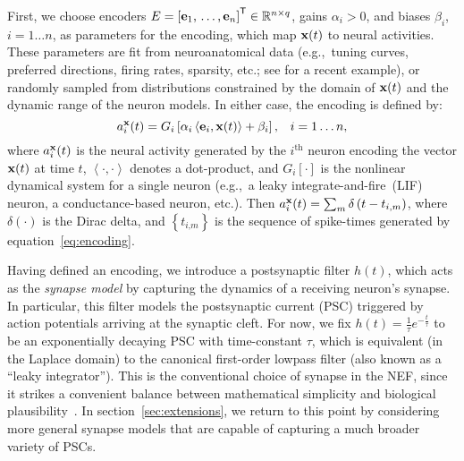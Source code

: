 First, we choose encoders $E = {\left[ \mathbf{e}_1\text{,}\, \ldots\text{,}\, \mathbf{e}_n \right]}^\mathsf{T} \in \mathbb{R}^{n \times q}$, gains $\alpha_i > 0$, and biases $\beta_i$, $i = 1 \ldots n$, as parameters for the encoding, which map $\mathbf{x}(t)$ to neural activities.
These parameters are fit from neuroanatomical data (e.g.,~tuning curves, preferred directions, firing rates, sparsity, etc.; see \citet{voelker2016a} for a recent example), or randomly sampled from distributions constrained by the domain of $\mathbf{x}(t)$ and the dynamic range of the neuron models.
In either case, the encoding is defined by:
\begin{equation} \label{eq:encoding}
a_i^{\mathbf{x}}(t) = G_i \left[ \alpha_i \left\langle \mathbf{e}_i, \mathbf{x}(t) \right\rangle + \beta_i \right] \text{,} \quad i = 1 \ldots n \text{,}
\end{equation}
where $a_i^{\mathbf{x}}(t)$ is the neural activity generated by the $i^{\text{th}}$ neuron encoding the vector $\mathbf{x}(t)$ at time $t$, $\left\langle \cdot , \cdot \right\rangle$ denotes a dot-product, and $G_i[\cdot]$ is the nonlinear dynamical system for a single neuron (e.g.,~a leaky integrate-and-fire~(LIF) neuron, a conductance-based neuron, etc.).
Then $a_i^{\mathbf{x}}(t) = \sum_m \delta \left(t - t_{i\text{,}m} \right)$, where $\delta(\cdot)$ is the Dirac delta, and $\left\{ t_{i\text{,}m} \right\}$ is the sequence of spike-times generated by equation~\ref{eq:encoding}. %

Having defined an encoding, we introduce a postsynaptic filter $h(t)$, which acts as the \emph{synapse model} by capturing the dynamics of a receiving neuron's synapse.
In particular, this filter models the postsynaptic current (PSC) triggered by action potentials arriving at the synaptic cleft.
For now, we fix $h(t) = \frac{1}{\tau} e^{-\frac{t}{\tau}}$ to be an exponentially decaying PSC with time-constant $\tau$, which is equivalent (in the Laplace domain) to the canonical first-order lowpass filter (also known as a ``leaky integrator'').
This is the conventional choice of synapse in the NEF, since it strikes a convenient balance between mathematical simplicity and biological plausibility~\citep{eliasmith2003a}.
In section~\ref{sec:extensions}, we return to this point by considering more general synapse models that are capable of capturing a much broader variety of PSCs.

